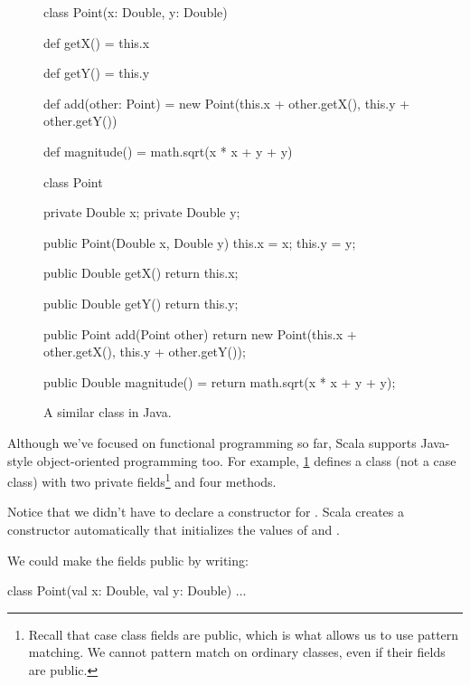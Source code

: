 \documentclass[9pt]{extbook}
\begin{document}
\begin{figure}
\begin{minipage}{0.45\textwidth}
\begin{scalacode}
class Point(x: Double, y: Double) {

  def getX() = this.x

  def getY() = this.y

  def add(other: Point) = {
    new Point(this.x + other.getX(),
              this.y + other.getY())
  }

  def magnitude() = math.sqrt(x * x + y + y)
}
\end{scalacode}
\caption{A class for points.}\label{pointclass}
\end{minipage}
\quad\vrule\quad
\begin{minipage}{0.45\textwidth}
\begin{javacode}
class Point {
  private Double x;
  private Double y;

  public Point(Double x, Double y) {
    this.x = x;
    this.y = y;
  }

  public Double getX() {
    return this.x;
  }

  public Double getY() {
    return this.y;
  }

  public Point add(Point other) {
    return new Point(this.x + other.getX(),
                     this.y + other.getY());
  }

  public Double magnitude() = {
    return math.sqrt(x * x + y + y);
  }
}
\end{javacode}
\caption{A similar class in Java.}
\end{minipage}
\end{figure}

Although we've focused on functional programming so far, Scala supports
Java-style object-oriented programming too. For example, \cref{pointclass}
defines a  class (not a case class) with two private
fields\footnote{Recall that case class fields are public, which
is what allows us to use pattern matching. We cannot pattern match on ordinary classes,
even if their fields are public.} and four methods.

Notice that we didn't have to declare a constructor for .
Scala creates a constructor automatically that initializes the values of
 and .

We could make the fields public by writing:
\begin{scalacode}
class Point(val x: Double, val y: Double) { ... }
\end{scalacode}
\end{document}
